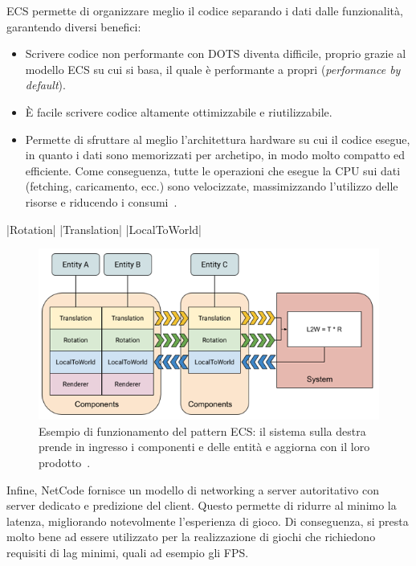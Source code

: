 ECS permette di organizzare meglio il codice separando i dati dalle funzionalità, garantendo diversi benefici:
\begin{itemize}
    \item Scrivere codice non performante con DOTS diventa difficile, proprio grazie al modello ECS su cui si basa, il quale è performante a propri (\emph{performance by default}).
    \item È facile scrivere codice altamente ottimizzabile e riutilizzabile.
    \item Permette di sfruttare al meglio l'architettura hardware su cui il codice esegue, in quanto i dati sono memorizzati per archetipo, in modo molto compatto ed efficiente. Come conseguenza, tutte le operazioni che esegue la CPU sui dati (fetching, caricamento, ecc.) sono velocizzate, massimizzando l'utilizzo delle risorse e riducendo i consumi~\cite{youtube:overview-ecs-job}.
\end{itemize}

|Rotation|
|Translation|
|LocalToWorld|

\begin{figure}[!ht]
    \centering
    \includegraphics[width=0.90\columnwidth]{gfx/imgs/chapter1/ECSBlockDiagram.png}
    \caption{Esempio di funzionamento del pattern ECS: il sistema sulla destra prende in ingresso i componenti  e  delle entità e aggiorna  con il loro prodotto~\cite{doc:unity-entities-manual}.}
    \label{fig:ecs-example}
\end{figure}
Infine, NetCode fornisce un modello di networking a server autoritativo con server dedicato e predizione del client. Questo permette di ridurre al minimo la latenza, migliorando notevolmente l'esperienza di gioco. Di conseguenza, si presta molto bene ad essere utilizzato per la realizzazione di giochi che richiedono requisiti di lag minimi, quali ad esempio gli FPS.

